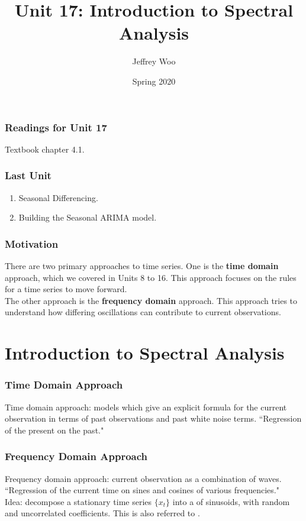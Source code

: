 \documentclass[%
xcolor=pdftex]{beamer}
\title{Unit 17: Introduction to Spectral Analysis}
\author[STAT 5170: Applied Time Series, Unit 17]{Jeffrey Woo}
\institute{Department of Statistics, University of Virginia}
\date{Spring 2020}
\begin{document}
\frame{\titlepage}


\begin{frame}
\frametitle{Readings for Unit 17}

Textbook chapter 4.1.

\end{frame}



\begin{frame}
\frametitle{Last Unit}
\begin{enumerate}
\item Seasonal Differencing.
\item Building the Seasonal ARIMA model.
\end{enumerate}
\end{frame}

\begin{frame}
\frametitle{Motivation}

There are two primary approaches to time series.  One is the \textbf{time domain} approach, which we covered in Units 8 to 16.  This approach focuses on the rules for a time series to move forward.\\
\vspace{5mm}
The other approach is the \textbf{frequency domain} approach.  This approach tries to understand how differing oscillations can contribute to current observations.

\end{frame}

\section{Introduction to Spectral Analysis}
\frame{\tableofcontents[currentsection]}

\begin{frame}
\frametitle{Time Domain Approach}

Time domain approach: models which give an explicit formula for the current observation in terms of past observations and past white noise terms. ``Regression of the present on the past."

\end{frame}

\begin{frame}
\frametitle{Frequency Domain Approach}

Frequency domain approach: current observation as a combination of waves.  ``Regression of the current  time on sines and cosines of various frequencies."\\
\vspace{5mm}
Idea: decompose a stationary time series $\{x_t\}$ into a \underline{\hspace{20 mm}} of sinusoids, with random and uncorrelated coefficients. This is also referred to \underline{\hspace{30 mm}}.


\end{frame}
\end{document}
